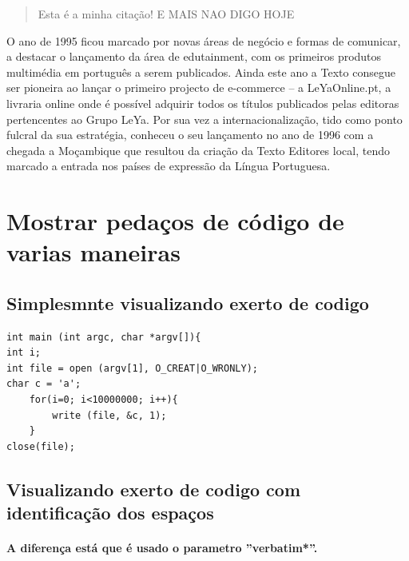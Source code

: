 \documentclass[a4paper,11pt]{report}%
\begin{document}
\begin{quote}
	Esta é a minha citação! \newline 
	E MAIS NAO DIGO HOJE
\end{quote}

O ano de 1995 ficou marcado por novas áreas de negócio e formas de comunicar, a destacar o lançamento da área de edutainment, com os primeiros produtos multimédia em português a serem publicados. Ainda este ano a Texto consegue ser pioneira ao lançar o primeiro projecto de e-commerce – a LeYaOnline.pt, a livraria online onde é possível adquirir todos os títulos publicados pelas editoras pertencentes ao Grupo LeYa. Por sua vez a internacionalização, tido como ponto fulcral da sua estratégia, conheceu o seu lançamento no ano de 1996 com a chegada a Moçambique que resultou da criação da Texto Editores local, tendo marcado a entrada nos países de expressão da Língua Portuguesa.


\newpage
\section {Mostrar pedaços de código de varias maneiras}

\subsection {Simplesmnte visualizando exerto de codigo}
\begin{verbatim}
int main (int argc, char *argv[]){
int i; 
int file = open (argv[1], O_CREAT|O_WRONLY);
char c = 'a'; 
	for(i=0; i<10000000; i++){
		write (file, &c, 1); 
	}
close(file);
\end{verbatim}
\subsection {Visualizando exerto de codigo com identificação dos espaços}
\paragraph {A diferença está que é usado o parametro ''verbatim*''.}
\begin{verbatim*}
int main (int argc, char *argv[]){
int i; 
int file = open (argv[1], O_CREAT|O_WRONLY);
char c = 'a'; 
	for(i=0; i<10000000; i++){
		write (file, &c, 1); 
	}
close(file);
\end{verbatim*}
\end{document}
